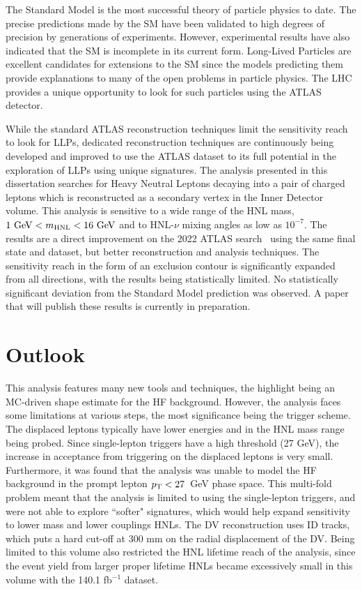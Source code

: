 The Standard Model is the most successful theory of particle physics to date. The precise predictions made by the SM have been validated to high degrees of precision by generations of experiments. However, experimental results have also indicated that the SM is incomplete in its current form. Long-Lived Particles are excellent candidates for extensions to the SM since the models predicting them provide explanations to many of the open problems in particle physics. The LHC provides a unique opportunity to look for such particles using the ATLAS detector. 

While the standard ATLAS reconstruction techniques limit the sensitivity reach to look for LLPs, dedicated reconstruction techniques are continuously being developed and improved to use the ATLAS dataset to its full potential in the exploration of LLPs using unique signatures. The analysis presented in this dissertation searches for Heavy Neutral Leptons decaying into a pair of charged leptons which is reconstructed as a secondary vertex in the Inner Detector volume. This analysis is sensitive to a wide range of the HNL mass, $1\text{ GeV}<m_{\mathrm{HNL}}<16\text{ GeV}$ and to HNL-$\nu$ mixing angles as low as $10^{-7}$. The results are a direct improvement on the 2022 ATLAS search~\cite{PhysRevLett.131.061803} using the same final state and dataset, but better reconstruction and analysis techniques. The sensitivity reach in the form of an exclusion contour is significantly expanded from all directions, with the results being statistically limited. No statistically significant deviation from the Standard Model prediction was observed. A paper that will publish these results is currently in preparation.


\section{Outlook}
This analysis features many new tools and techniques, the highlight being an MC-driven shape estimate for the HF background. However, the analysis faces some limitations at various steps, the most significance being the trigger scheme. The displaced leptons typically have lower energies and \pT in the HNL mass range being probed. Since single-lepton triggers have a high \pT threshold (27 GeV), the increase in acceptance from triggering on the displaced leptons is very small. Furthermore, it was found that the analysis was unable to model the HF background in the prompt lepton $p_\mathrm{T}<27$~GeV phase space. This multi-fold problem meant that the analysis is limited to using the single-lepton triggers, and were not able to explore ``softer" signatures, which would help expand sensitivity to lower mass and lower couplings HNLs. The DV reconstruction uses ID tracks, which puts a hard cut-off at 300 mm on the radial displacement of the DV. Being limited to this volume also restricted the HNL lifetime reach of the analysis, since the event yield from larger proper lifetime HNLs became excessively small in this volume with the 140.1 fb$^{-1}$ dataset.

